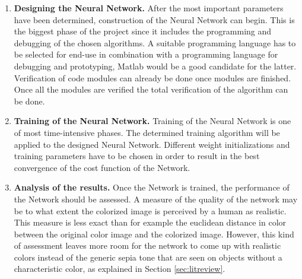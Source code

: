\begin{enumerate}
\item \textbf{Designing the Neural Network.}
After the most important parameters have been determined, construction of the Neural Network can begin. This is the biggest phase of the project since it includes the programming and debugging of the chosen algorithms. A suitable programming language has to be selected for end-use in combination with a programming language for debugging and prototyping, Matlab would be a good candidate for the latter. Verification of code modules can already be done once modules are finished. Once all the modules are verified the total verification of the algorithm can be done.
\item \textbf{Training of the Neural Network.}
Training of the Neural Network is one of most time-intensive phases. The determined training algorithm will be applied to the designed Neural Network. Different weight initializations and training parameters have to be chosen in order to result in the best convergence of the cost function of the Network. 

\item \textbf{Analysis of the results.}
Once the Network is trained, the performance of the Network should be assessed. A measure of the quality of the network may be to what extent the colorized image is perceived by a human as realistic. This measure is less exact than for example the euclidean distance in color between the original color image and the colorized image. However, this kind of assessment leaves more room for the network to come up with realistic colors instead of the generic sepia tone that are seen on objects without a characteristic color, as explained in Section \ref{sec:litreview}.
\end{enumerate}





